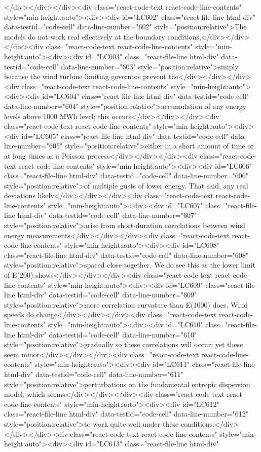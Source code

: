 {{{{</div></div></div><div class="react-code-text react-code-line-contents" style="min-height:auto"><div><div id="LC602" class="react-file-line html-div" data-testid="code-cell" data-line-number="602" style="position:relative">The models do not work real effectively at the boundary conditions,</div></div></div><div class="react-code-text react-code-line-contents" style="min-height:auto"><div><div id="LC603" class="react-file-line html-div" data-testid="code-cell" data-line-number="603" style="position:relative">simply because the wind turbine limiting governors prevent the</div></div></div><div class="react-code-text react-code-line-contents" style="min-height:auto"><div><div id="LC604" class="react-file-line html-div" data-testid="code-cell" data-line-number="604" style="position:relative">accumulation of any energy levels above 1000 MWh level; this occurs</div></div></div><div class="react-code-text react-code-line-contents" style="min-height:auto"><div><div id="LC605" class="react-file-line html-div" data-testid="code-cell" data-line-number="605" style="position:relative">either in a short amount of time or at long times as a Poisson process</div></div></div><div class="react-code-text react-code-line-contents" style="min-height:auto"><div><div id="LC606" class="react-file-line html-div" data-testid="code-cell" data-line-number="606" style="position:relative">of multiple gusts of lower energy. That said, any real deviations likely</div></div></div><div class="react-code-text react-code-line-contents" style="min-height:auto"><div><div id="LC607" class="react-file-line html-div" data-testid="code-cell" data-line-number="607" style="position:relative">arise from short-duration correlations between wind energy measurements</div></div></div><div class="react-code-text react-code-line-contents" style="min-height:auto"><div><div id="LC608" class="react-file-line html-div" data-testid="code-cell" data-line-number="608" style="position:relative">spaced close together. We do see this as the lower limit of E(200) shows</div></div></div><div class="react-code-text react-code-line-contents" style="min-height:auto"><div><div id="LC609" class="react-file-line html-div" data-testid="code-cell" data-line-number="609" style="position:relative">more correlation curvature than E(1000) does. Wind speeds do change</div></div></div><div class="react-code-text react-code-line-contents" style="min-height:auto"><div><div id="LC610" class="react-file-line html-div" data-testid="code-cell" data-line-number="610" style="position:relative">gradually so these correlations will occur; yet these seem minor</div></div></div><div class="react-code-text react-code-line-contents" style="min-height:auto"><div><div id="LC611" class="react-file-line html-div" data-testid="code-cell" data-line-number="611" style="position:relative">perturbations on the fundamental entropic dispersion model, which seems</div></div></div><div class="react-code-text react-code-line-contents" style="min-height:auto"><div><div id="LC612" class="react-file-line html-div" data-testid="code-cell" data-line-number="612" style="position:relative">to work quite well under these conditions.</div></div></div><div class="react-code-text react-code-line-contents" style="min-height:auto"><div><div id="LC613" class="react-file-line html-div" }}}}

